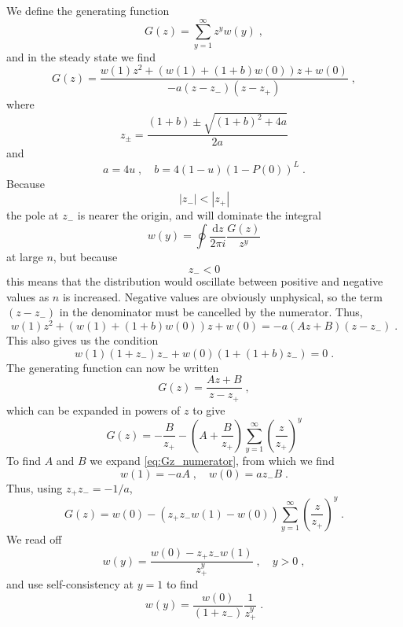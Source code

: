 \documentclass[a4paper,10pt]{article}
\newcommand{\pzero}{P(0)}
\newcommand{\wone}{w(1)}
\newcommand{\wzero}{w(0)}
\newcommand{\wy}{w(y)}
\newcommand{\D}{\mathrm{d}}
\begin{document}
We define the generating function
\begin{equation}
 G(z) = \sum_{y=1}^{\infty}z^y\wy \;,
\end{equation}
and in the steady state we find
\begin{equation}
  G(z) = \frac{\wone z^2 + (\wone + (1+b)\wzero)z + \wzero}{-a(z-z_-)(z-z_+)} \;,
\end{equation}
where
\begin{equation}
  z_\pm = \frac{ (1+b) \pm \sqrt{ (1+b)^2 + 4a }}{2a}
\end{equation}
and
\begin{equation}
  a = 4u \;, \quad b = 4(1-u)(1-\pzero)^L \;.
\end{equation}
Because
\begin{equation}
  |z_-| < |z_+|
\end{equation}
the pole at $z_-$ is nearer the origin, and will dominate the integral
\begin{equation}
 \wy = \oint \frac{\D z}{2\pi i} \frac{G(z)}{z^y}
\end{equation}
at large $n$, but because 
\begin{equation}
  z_- < 0 
\end{equation}
this means that the distribution would oscillate between positive and negative values as $n$ is increased. Negative values are obviously unphysical, so the term $(z-z_-)$ in the denominator must be cancelled by the numerator. Thus,
\begin{equation}\label{eq:Gz_numerator}
  \wone z^2 + (\wone + (1+b)\wzero)z + \wzero = -a(Az+B)(z-z_-)\;.
\end{equation}
This also gives us the condition
\begin{equation}
  \wone(1+z_-)z_- + \wzero(1+(1+b)z_-) = 0 \;.
\end{equation}
The generating function can now be written
\begin{equation}
  G(z) = \frac{Az + B}{z-z_+} \;,
\end{equation}
which can be expanded in powers of $z$ to give
\begin{equation}
  G(z) = -\frac{B}{z_+} - \left( A + \frac{B}{z_+} \right) \sum_{y=1}^\infty \left( \frac{z}{z_+} \right)^y
\end{equation}
To find $A$ and $B$ we expand \eqref{eq:Gz_numerator}, from which we find
\begin{equation}
  \wone = -aA \;, \quad \wzero = az_-B \;.
\end{equation}
Thus, using $z_+z_- = -1/a$,
\begin{equation}
  G(z) = \wzero - \left( z_+z_-\wone - \wzero \right) \sum_{y=1}^\infty \left( \frac{z}{z_+} \right)^y \;.
\end{equation}
We read off
\begin{equation}
  \wy = \frac{\wzero - z_+z_- \wone}{z_+^y} \;, \quad y > 0\;,
\end{equation}
and use self-consistency at $y=1$ to find
\begin{equation}\label{eq:wy}
  \wy = \frac{\wzero}{(1+z_-)} \frac{1}{z_+^y} \;.
\end{equation}
\end{document}
